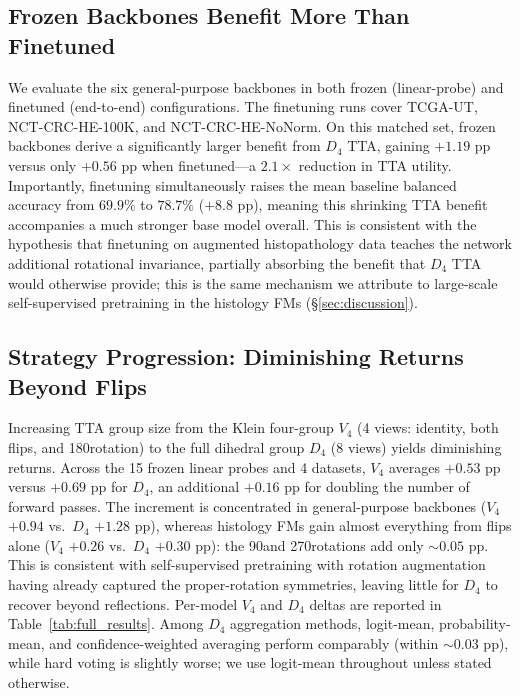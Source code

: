 \documentclass{melba}
\begin{document}
\subsection{Frozen Backbones Benefit More Than Finetuned}
\label{sec:frozen_ft}

We evaluate the six general-purpose backbones in both frozen (linear-probe) and finetuned (end-to-end) configurations. The finetuning runs cover TCGA-UT, NCT-CRC-HE-100K, and NCT-CRC-HE-NoNorm. On this matched set, frozen backbones derive a significantly larger benefit from $D_4$ TTA, gaining $+1.19$ pp versus only $+0.56$ pp when finetuned—a $2.1\times$ reduction in TTA utility. Importantly, finetuning simultaneously raises the mean baseline balanced accuracy from $69.9\%$ to $78.7\%$ ($+8.8$ pp), meaning this shrinking TTA benefit accompanies a much stronger base model overall. This is consistent with the hypothesis that finetuning on augmented histopathology data teaches the network additional rotational invariance, partially absorbing the benefit that $D_4$ TTA would otherwise provide; this is the same mechanism we attribute to large-scale self-supervised pretraining in the histology FMs (\S\ref{sec:discussion}).


\subsection{Strategy Progression: Diminishing Returns Beyond Flips}

Increasing TTA group size from the Klein four-group $V_4$ (4 views: identity, both flips, and 180\textdegree rotation) to the full dihedral group $D_4$ (8 views) yields diminishing returns. Across the 15 frozen linear probes and 4 datasets, $V_4$ averages $+0.53$ pp versus $+0.69$ pp for $D_4$, an additional $+0.16$ pp for doubling the number of forward passes. The increment is concentrated in general-purpose backbones ($V_4$ $+0.94$ vs.\ $D_4$ $+1.28$ pp), whereas histology FMs gain almost everything from flips alone ($V_4$ $+0.26$ vs.\ $D_4$ $+0.30$ pp): the 90\textdegree and 270\textdegree rotations add only ${\sim}0.05$ pp. This is consistent with self-supervised pretraining with rotation augmentation having already captured the proper-rotation symmetries, leaving little for $D_4$ to recover beyond reflections. Per-model $V_4$ and $D_4$ deltas are reported in Table~\ref{tab:full_results}.
Among $D_4$ aggregation methods, logit-mean, probability-mean, and confidence-weighted averaging perform comparably (within $\sim 0.03$ pp), while hard voting is slightly worse; we use logit-mean throughout unless stated otherwise.
\end{document}
